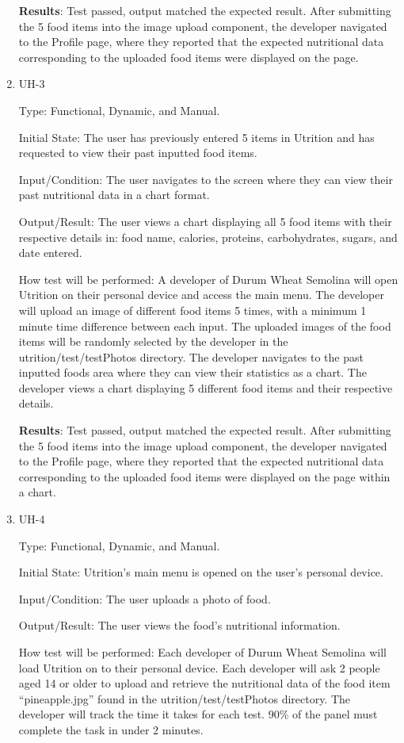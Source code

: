 \documentclass[12pt, titlepage]{article}
\begin{document}
\begin{enumerate}
		\textbf{Results}: Test passed, output matched the expected result. After submitting the 5 food items into the image upload component, the developer navigated to the Profile page, where they reported that the expected nutritional data corresponding to the uploaded food items were displayed on the page.
		
		\item{UH-3}
		
		Type: Functional, Dynamic, and Manual.
		
		Initial State: The user has previously entered 5 items in Utrition and has requested to view their past inputted food items.
		
		Input/Condition: The user navigates to the screen where they can view their past nutritional data in a chart format.
		
		Output/Result: The user views a chart displaying all 5 food items with their respective details in: food name, calories, proteins, carbohydrates, sugars, and date entered.
		
		How test will be performed: A developer of Durum Wheat Semolina will open Utrition on their personal device and access the main menu. The developer will upload an image of different food items 5 times, with a minimum 1 minute time difference between each input. The uploaded images of the food items will be randomly selected by the developer in the utrition/test/testPhotos directory. The developer navigates to the past inputted foods area where they can view their statistics as a chart. The developer views a chart displaying 5 different food items and their respective details.
		
		\textbf{Results}: Test passed, output matched the expected result. After submitting the 5 food items into the image upload component, the developer navigated to the Profile page, where they reported that the expected nutritional data corresponding to the uploaded food items were displayed on the page within a chart.
		
		\item{UH-4}
		
		Type: Functional, Dynamic, and Manual.
		
		Initial State: Utrition’s main menu is opened on the user’s personal device.
		
		Input/Condition: The user uploads a photo of food.
		
		Output/Result: The user views the food’s nutritional information.
		
		How test will be performed: Each developer of Durum Wheat Semolina will load Utrition on to their personal device. Each developer will ask 2 people aged 14 or older to upload and retrieve the nutritional data of the food item “pineapple.jpg” found in the utrition/test/testPhotos directory. The developer will track the time it takes for each test. 90\% of the panel must complete the task in under 2 minutes.
		

\end{enumerate}
\end{document}
